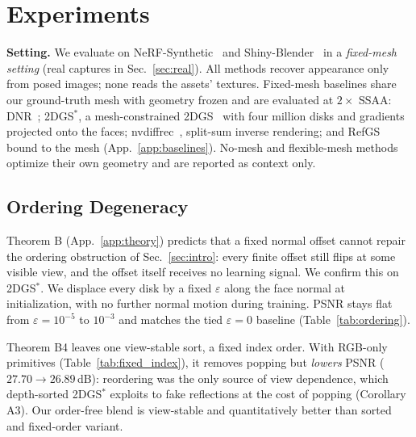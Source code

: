 

\vspace{-1mm}
\section{Experiments}
\vspace{-1mm}
\label{sec:Exp}
\begin{revblock}
\textbf{Setting.} We evaluate on NeRF-Synthetic~\citep{NeRFVanilla} and Shiny-Blender~\citep{refnerf}
in a \emph{fixed-mesh setting} (real captures in Sec.~\ref{sec:real}). All methods recover appearance
only from posed images; none reads the assets' textures. Fixed-mesh baselines share our ground-truth
mesh with geometry frozen and are evaluated at $2\times$ SSAA: DNR~\citep{DNR}; 2DGS$^{*}$, a
mesh-constrained 2DGS~\citep{2DGS} with four million disks and gradients projected onto the faces;
nvdiffrec~\citep{nvdiffrec}, split-sum inverse rendering; and RefGS~\citep{refgs} bound to the mesh
(App.~\ref{app:baselines}). No-mesh and flexible-mesh methods optimize their own geometry and are
reported as context only.
\end{revblock}

\subsection{Ordering Degeneracy}
\label{sec:ordering}
Theorem B (App.~\ref{app:theory}) predicts that a fixed normal offset cannot repair the ordering
obstruction of Sec.~\ref{sec:intro}: every finite offset still flips at some visible view, and the
offset itself receives no learning signal. We confirm this on 2DGS$^{*}$. We displace every disk by a
fixed $\varepsilon$ along the face normal at initialization, with no further normal motion during
training. PSNR stays flat from $\varepsilon{=}10^{-5}$ to $10^{-3}$ and matches the tied
$\varepsilon{=}0$ baseline (Table~\ref{tab:ordering}).

\begin{addblock}
Theorem B4 leaves one view-stable sort, a fixed index order. With RGB-only primitives
(Table~\ref{tab:fixed_index}), it removes popping but \emph{lowers} PSNR ($27.70\to26.89$\,dB):
reordering was the only source of view dependence, which depth-sorted 2DGS$^{*}$ exploits to fake
reflections at the cost of popping (Corollary A3). Our order-free blend is view-stable and quantitatively better than sorted and fixed-order variant.
\end{addblock}



